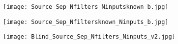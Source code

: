 \documentclass{article}
\begin{document}
\begin{figure}
  \centering
  \texttt{[image: Source\_Sep\_Nfilters\_Ninputsknown\_b.jpg]}
\end{figure}

\begin{figure}
  \centering
  \texttt{[image: Source\_Sep\_Nfiltersknown\_Ninputs\_b.jpg]}
\end{figure}

\begin{figure}
  \centering
  \texttt{[image: Blind\_Source\_Sep\_Nfilters\_Ninputs\_v2.jpg]}
\end{figure}
\end{document}
